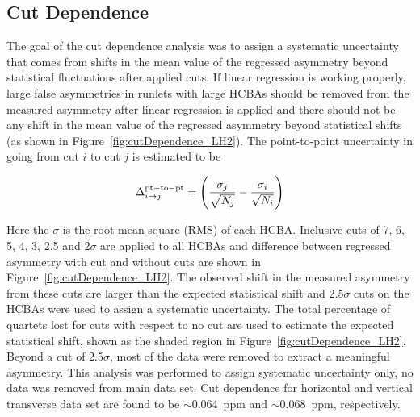 \subsection{Cut Dependence}
\label{Cut Dependence}
The goal of the cut dependence analysis was to assign a systematic uncertainty that comes from shifts in the mean value of the regressed asymmetry beyond statistical fluctuations after applied cuts. If linear regression is working properly, large false asymmetries in runlets with large HCBAs should be removed from the measured asymmetry after linear regression is applied and there should not be any shift in the mean value of the regressed asymmetry beyond statistical shifts (as shown in Figure~\ref{fig:cutDependence_LH2}).
The point-to-point uncertainty in going from cut $i$ to cut $j$ is estimated to be

\begin{equation} \label{equ:eqCutDependence1}
\Delta_{i \rightarrow j}^{\rm pt-to-pt} = \left( \frac{\sigma_{j}}{\sqrt{N_{j}}} - \frac{\sigma_{i}}{\sqrt{N_{i}}} \right)
\end{equation}


Here the $\sigma$ is the root mean square (RMS) of each HCBA.
Inclusive cuts of 7, 6, 5, 4, 3, 2.5 and 2$\sigma$ are applied to all HCBAs and difference between regressed asymmetry with cut and without cuts are shown in Figure~\ref{fig:cutDependence_LH2}.
The observed shift in the measured asymmetry from these cuts are larger than the expected statistical shift and 2.5$\sigma$ cuts on the HCBAs were used to assign a systematic uncertainty. The total percentage of quartets lost for cuts with respect to no cut are used to estimate the expected statistical shift, shown as the shaded region in Figure~\ref{fig:cutDependence_LH2}. Beyond a cut of 2.5$\sigma$, most of the data were removed to extract a meaningful asymmetry. This analysis was performed to assign systematic uncertainty only, no data was removed from main data set. 
Cut dependence for horizontal and vertical transverse data set are found to be $\sim$0.064~ppm and $\sim$0.068~ppm, respectively.


